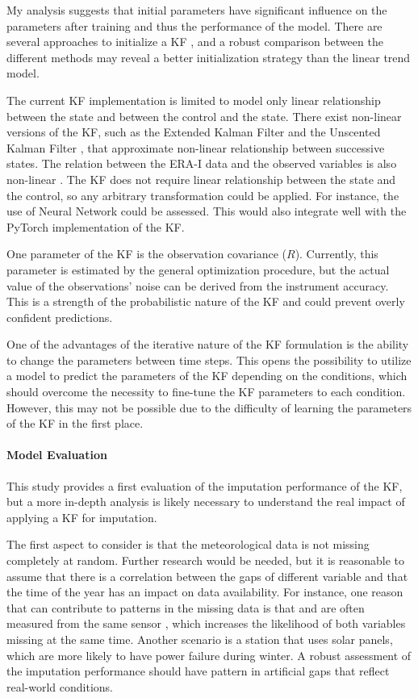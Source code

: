 \documentclass{article}
\begin{document}
My analysis suggests that initial parameters have significant influence on the parameters after training and thus the performance of the model. There are several approaches to initialize a KF \cite{durbin_time_2012}, and a robust comparison between the different methods may reveal a better initialization strategy than the linear trend model.

The current KF implementation is limited to model only linear relationship between the state and between the control and the state. There exist non-linear versions of the KF, such as the Extended Kalman Filter and the Unscented Kalman Filter \cite{dan_simon_optimal_2006}, that approximate non-linear relationship between successive states.
The relation between the ERA-I data and the observed variables is also non-linear \cite{vuichard_filling_2015}. The KF does not require linear relationship between the state and the control, so any arbitrary transformation could be applied. For instance, the use of Neural Network could be assessed. This would also integrate well with the \textsf{PyTorch} implementation of the KF.

One parameter of the KF is the observation covariance ($R$). Currently, this parameter is estimated by the general optimization procedure, but the actual value of the observations' noise can be derived from the instrument accuracy. This is a strength of the probabilistic nature of the KF and could prevent overly confident predictions.

One of the advantages of the iterative nature of the KF formulation is the ability to change the parameters between time steps.
This opens the possibility to utilize a model to predict the parameters of the KF depending on the conditions, which should overcome the necessity to fine-tune the KF parameters to each condition.
However, this may not be possible due to the difficulty of learning the parameters of the KF in the first place.

\paragraph{Model Evaluation} This study provides a first evaluation of the imputation performance of the KF, but a more in-depth analysis is likely necessary to understand the real impact of applying a KF for imputation.

The first aspect to consider is that the meteorological data is not missing completely at random. Further research would be needed, but it is reasonable to assume that there is a correlation between the gaps of different variable and that the time of the year has an impact on data availability. For instance, one reason that can contribute to patterns in the missing data is that  and  are often measured from the same sensor \cite{noauthor_associated_2020, noauthor_specification_nodate}, which increases the likelihood of both variables missing at the same time. Another scenario is a station that uses solar panels, which are more likely to have power failure during winter. A robust assessment of the imputation performance should have pattern in artificial gaps that reflect real-world conditions.
\end{document}
